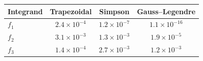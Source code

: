 \begin{tabular}{lccc}
\toprule
Integrand & Trapezoidal & Simpson & Gauss--Legendre \\
\midrule
$f_1$ & $2.4\times10^{-4}$ & $1.2\times10^{-7}$ & $1.1\times10^{-16}$ \\
$f_2$ & $3.1\times10^{-3}$ & $1.3\times10^{-3}$ & $1.9\times10^{-5}$ \\
$f_3$ & $1.4\times10^{-4}$ & $2.7\times10^{-3}$ & $1.2\times10^{-3}$ \\
\bottomrule
\end{tabular}
